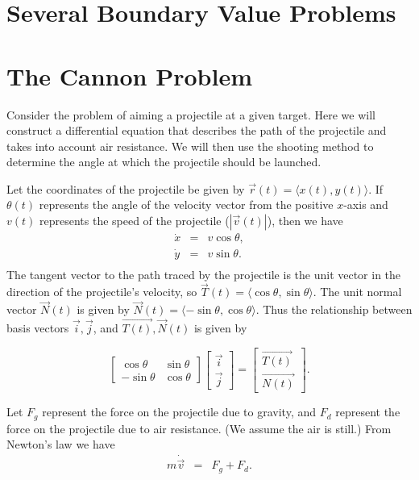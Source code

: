 \pagebreak

\section{Several Boundary Value Problems}

\section*{The Cannon Problem}

Consider the problem of aiming a projectile at a given target. Here we will construct a differential equation that describes the path of the projectile and takes into account air resistance. We will then use the shooting method to determine the angle at which the projectile should be launched. 

Let the coordinates of the projectile be given by $\vec{r}(t) = \langle x(t), y(t) \rangle.$ If $\theta(t)$ represents the angle of the velocity vector from the positive $x$-axis and $v(t)$ represents the speed of the projectile ($ |\vec{v}(t) |$), then we have 
\begin{eqnarray*}
\dot{x} &=& v\cos{\theta},\\
\dot{y} &=& v\sin{\theta}.\\
\end{eqnarray*}
The tangent vector to the path traced by the projectile is the unit vector in the direction of the projectile's velocity, so $\vec{T}(t) = \langle \cos{\theta}, \sin{\theta} \rangle.$ The unit normal vector $\vec{N} (t)$ is given by $\vec{N} (t)= \langle -\sin{\theta}, \cos{\theta} \rangle.$ Thus the relationship between basis vectors $\vec{i}, \vec{j}$, and $\vec{T(t)}, \vec{N}(t)$ is given by 

\[
\left[\begin{array}{cc}\cos{\theta} & \sin{\theta} \\-\sin{\theta} & \cos{\theta}\end{array}\right] \left[\begin{array}{c}\vec{i} \\\vec{j}\end{array}\right] = \left[\begin{array}{c}\vec{T(t)} \\\vec{N(t)}\end{array}\right]
.\]


Let $F_g$ represent the force on the projectile due to gravity, and $F_d$ represent the force on the projectile due to air resistance. (We assume the air is still.) From Newton's law we have
\begin{eqnarray*}
m \dot{\vec{v}} &=& F_g + F_d.
\end{eqnarray*}

